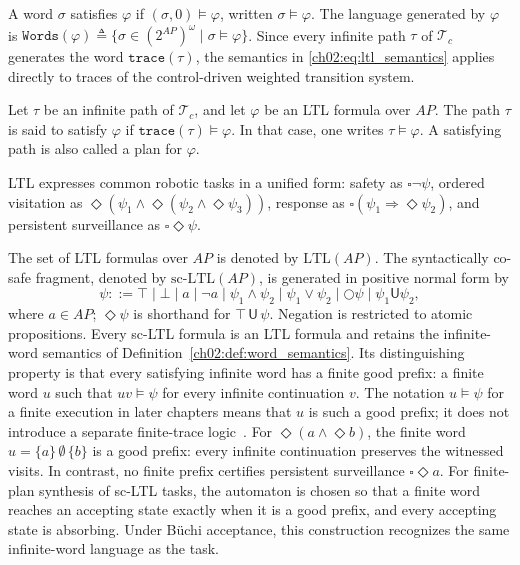 A word $\sigma$ satisfies $\varphi$ if $(\sigma,0)\models \varphi$, written
$\sigma \models \varphi$. The language generated by $\varphi$ is
$\texttt{Words}(\varphi) \triangleq
\{\sigma \in (2^{AP})^{\omega} \mid \sigma \models \varphi\}$.
Since every infinite path $\tau$ of $\mathcal{T}_c$ generates the word
$\texttt{trace}(\tau)$, the semantics in \eqref{ch02:eq:ltl_semantics} applies
directly to traces of the control-driven weighted transition system.

\begin{definition}
\label{ch02:def:path-satisfy}
Let $\tau$ be an infinite path of $\mathcal{T}_c$, and let $\varphi$ be an LTL
formula over $AP$. The path $\tau$ is said to satisfy $\varphi$ if
$\texttt{trace}(\tau) \models \varphi$. In that case, one writes
$\tau \models \varphi$. A satisfying path is also called a plan for
$\varphi$.
\end{definition}

LTL expresses common robotic tasks in a unified form: safety as
$\square \neg \psi$, ordered visitation as
$\Diamond(\psi_1 \wedge \Diamond(\psi_2 \wedge \Diamond \psi_3))$, response as
$\square(\psi_1 \Rightarrow \Diamond \psi_2)$, and persistent surveillance as
$\square \Diamond \psi$. \begin{revision}
The set of LTL formulas over $AP$ is denoted by $\mathrm{LTL}(AP)$.
The syntactically co-safe fragment, denoted by $\mathrm{sc\mbox{-}LTL}(AP)$,
is generated in positive normal form by
\[
\psi ::= \top\mid\bot\mid a\mid\neg a
\mid\psi_1\wedge\psi_2\mid\psi_1\vee\psi_2
\mid\bigcirc\psi\mid\psi_1\mathsf{U}\psi_2,
\]
where $a\in AP$; $\Diamond\psi$ is shorthand for
$\top\,\mathsf{U}\,\psi$. Negation is restricted to atomic propositions.
Every sc-LTL formula is an LTL formula and retains the infinite-word
semantics of Definition~\ref{ch02:def:word_semantics}.
Its distinguishing property is that every satisfying infinite word has a
finite good prefix: a finite word $u$ such that $uv\models\psi$ for
every infinite continuation $v$. The notation $u\models\psi$ for a finite
execution in later chapters means that $u$ is such a good prefix; it does
not introduce a separate finite-trace logic~\citep{kupferman2001model}.
For $\Diamond(a\wedge\Diamond b)$, the finite word
$u=\{a\}\,\emptyset\,\{b\}$ is a good prefix: every infinite continuation
preserves the witnessed visits. In contrast, no finite prefix certifies
persistent surveillance $\square\Diamond a$.
For finite-plan synthesis of sc-LTL tasks, the automaton is chosen so that
a finite word reaches an accepting state exactly when it is a good prefix,
and every accepting state is absorbing. Under B\"uchi acceptance, this
construction recognizes the same infinite-word language as the task.
\end{revision}


